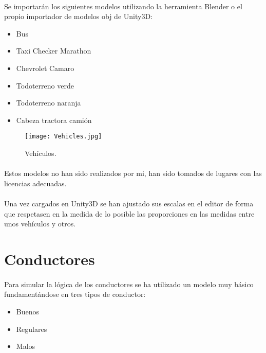 	\paragraph{}
	Se importarán los siguientes modelos utilizando la herramienta Blender \cite{Blender_web} o el propio importador de modelos obj de Unity3D:
	\begin{itemize}
		\item Bus
		\item Taxi Checker Marathon
		\item Chevrolet Camaro
		\item Todoterreno verde
		\item Todoterreno naranja
		\item Cabeza tractora camión
	\end{itemize}
	
	\begin{figure}[H]
		\centering
			\texttt{[image: Vehicles.jpg]}
	\caption{Vehículos.}
	\label{fig:Vehicles}
	\end{figure}
	
	\paragraph{}	
	Estos modelos no han sido realizados por mi, han sido tomados de lugares con las licencias adecuadas.
	
	\paragraph{}
	Una vez cargados en Unity3D se han ajustado sus escalas en el editor de forma que respetasen en la medida de lo posible las proporciones en las medidas entre unos vehículos y otros.
	
\section{Conductores}
\label{section:driverBehaviour}
	\paragraph{}
	Para simular la lógica de los conductores se ha utilizado un modelo muy básico fundamentándose en tres tipos de conductor:
	
	\begin{itemize}
	\item Buenos
	\item Regulares
	\item Malos
	\end{itemize}
	
